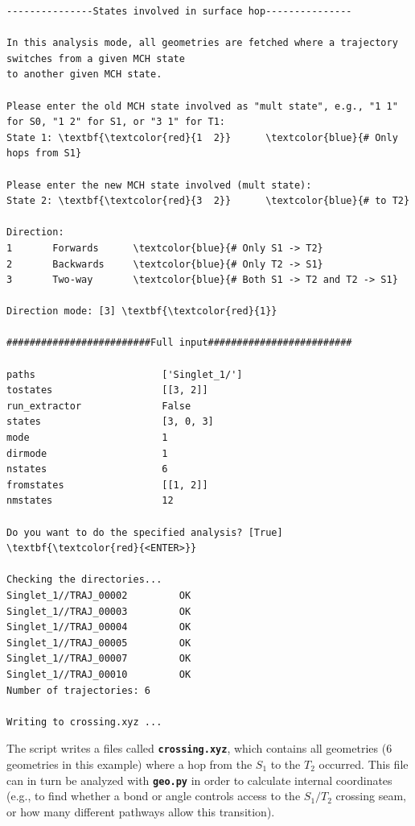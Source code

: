\documentclass[a4paper,11pt,DIV=15,openany]{scrbook}
\newcommand{\ttt}[1]{\textbf{\texttt{#1}}}
\begin{document}
\begin{oframed}
\begin{Verbatim}[commandchars=\\\{\}]
---------------States involved in surface hop---------------

In this analysis mode, all geometries are fetched where a trajectory switches from a given MCH state
to another given MCH state.

Please enter the old MCH state involved as "mult state", e.g., "1 1" for S0, "1 2" for S1, or "3 1" for T1:
State 1: \textbf{\textcolor{red}{1  2}}      \textcolor{blue}{# Only hops from S1}

Please enter the new MCH state involved (mult state):
State 2: \textbf{\textcolor{red}{3  2}}      \textcolor{blue}{# to T2}

Direction:
1       Forwards      \textcolor{blue}{# Only S1 -> T2}
2       Backwards     \textcolor{blue}{# Only T2 -> S1}
3       Two-way       \textcolor{blue}{# Both S1 -> T2 and T2 -> S1}

Direction mode: [3] \textbf{\textcolor{red}{1}}

#########################Full input#########################

paths                      ['Singlet_1/']
tostates                   [[3, 2]]
run_extractor              False
states                     [3, 0, 3]
mode                       1
dirmode                    1
nstates                    6
fromstates                 [[1, 2]]
nmstates                   12

Do you want to do the specified analysis? [True] \textbf{\textcolor{red}{<ENTER>}}

Checking the directories...
Singlet_1//TRAJ_00002         OK
Singlet_1//TRAJ_00003         OK
Singlet_1//TRAJ_00004         OK
Singlet_1//TRAJ_00005         OK
Singlet_1//TRAJ_00007         OK
Singlet_1//TRAJ_00010         OK
Number of trajectories: 6

Writing to crossing.xyz ...
\end{Verbatim}
\end{oframed}

\normalsize
The script writes a files called \ttt{crossing.xyz}, which contains all geometries (6 geometries in this example) where a hop from the $S_1$ to the $T_2$ occurred.
This file can in turn be analyzed with \ttt{geo.py} in order to calculate internal coordinates (e.g., to find whether a bond or angle controls access to the $S_1/T_2$ crossing seam, or how many different pathways allow this transition). 

\end{document}
